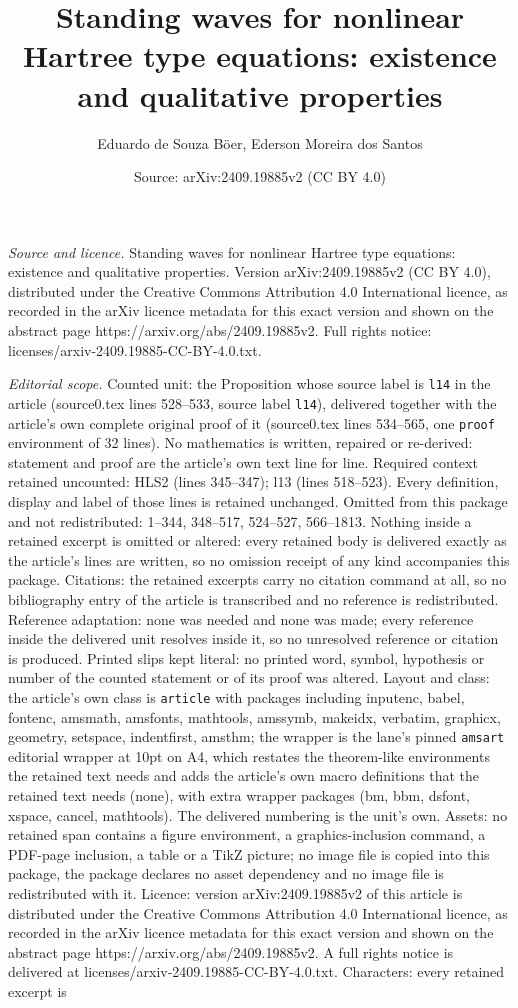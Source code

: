 \documentclass[10pt,a4paper]{amsart}
\title[Standing waves for nonlinear Hartree type equations: existen]{Standing waves for nonlinear Hartree type equations: existence and qualitative properties}
\author{Eduardo de Souza B\"oer, Ederson Moreira dos Santos}
\date{Source: arXiv:2409.19885v2 (CC BY 4.0)}
\begin{document}
\maketitle

\noindent\emph{Source and licence.} Standing waves for nonlinear Hartree type equations: existence and qualitative properties. Version arXiv:2409.19885v2 (CC BY 4.0), distributed under the Creative Commons Attribution 4.0 International licence, as recorded in the arXiv licence metadata for this exact version and shown on the abstract page https://arxiv.org/abs/2409.19885v2. Full rights notice: licenses/arxiv-2409.19885-CC-BY-4.0.txt.\par\smallskip

\noindent\textit{Editorial scope.} Counted unit: the Proposition whose source label is \texttt{l14} in the article (source0.tex lines 528--533, source label \texttt{l14}), delivered together with the article's own complete original proof of it (source0.tex lines 534--565, one \texttt{proof} environment of 32 lines). No mathematics is written, repaired or re-derived: statement and proof are the article's own text line for line. Required context retained uncounted: HLS2 (lines 345--347); l13 (lines 518--523). Every definition, display and label of those lines is retained unchanged. Omitted from this package and not redistributed: 1--344, 348--517, 524--527, 566--1813. Nothing inside a retained excerpt is omitted or altered: every retained body is delivered exactly as the article's lines are written, so no omission receipt of any kind accompanies this package. Citations: the retained excerpts carry no citation command at all, so no bibliography entry of the article is transcribed and no reference is redistributed. Reference adaptation: none was needed and none was made; every reference inside the delivered unit resolves inside it, so no unresolved reference or citation is produced. Printed slips kept literal: no printed word, symbol, hypothesis or number of the counted statement or of its proof was altered. Layout and class: the article's own class is \texttt{article} with packages including inputenc, babel, fontenc, amsmath, amsfonts, mathtools, amssymb, makeidx, verbatim, graphicx, geometry, setspace, indentfirst, amsthm; the wrapper is the lane's pinned \texttt{amsart} editorial wrapper at 10pt on A4, which restates the theorem-like environments the retained text needs and adds the article's own macro definitions that the retained text needs (none), with extra wrapper packages (bm, bbm, dsfont, xspace, cancel, mathtools). The delivered numbering is the unit's own. Assets: no retained span contains a figure environment, a graphics-inclusion command, a PDF-page inclusion, a table or a TikZ picture; no image file is copied into this package, the package declares no asset dependency and no image file is redistributed with it. Licence: version arXiv:2409.19885v2 of this article is distributed under the Creative Commons Attribution 4.0 International licence, as recorded in the arXiv licence metadata for this exact version and shown on the abstract page https://arxiv.org/abs/2409.19885v2. A full rights notice is delivered at licenses/arxiv-2409.19885-CC-BY-4.0.txt. Characters: every retained excerpt is 
\end{document}
